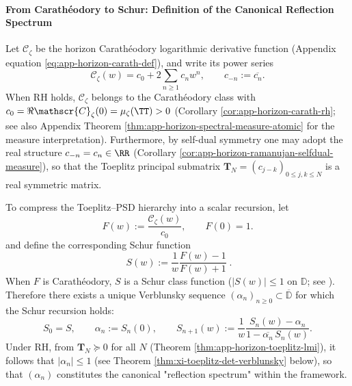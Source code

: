 \paragraph{From Carath\'eodory to Schur: Definition of the Canonical Reflection Spectrum}
Let \(\mathscr{C}_{\zeta}\) be the horizon Carath\'eodory logarithmic derivative function (Appendix equation \eqref{eq:app-horizon-carath-def}), and write its power series
\[
\mathscr{C}_{\zeta}(w)=c_0+2\sum_{n\ge 1}c_n w^n,
\qquad c_{-n}:=\overline{c_n}.
\]
When RH holds, \(\mathscr{C}_\zeta\) belongs to the Carath\'eodory class with \(c_0=\Re\mathscr{C}_\zeta(0)=\mu_\zeta(\TT)>0\) (Corollary \ref{cor:app-horizon-carath-rh}; see also Appendix Theorem \ref{thm:app-horizon-spectral-measure-atomic} for the measure interpretation).
Furthermore, by self-dual symmetry one may adopt the real structure \(c_{-n}=c_n\in\RR\) (Corollary \ref{cor:app-horizon-ramanujan-selfdual-measure}), so that the Toeplitz principal submatrix \(\mathbf{T}_N=(c_{j-k})_{0\le j,k\le N}\) is a real symmetric matrix.
\par
To compress the Toeplitz--PSD hierarchy into a scalar recursion, let
\[
F(w):=\frac{\mathscr{C}_{\zeta}(w)}{c_0},
\qquad F(0)=1.
\]
and define the corresponding Schur function
\begin{equation}\label{eq:xi-schur-from-carath}
\boxed{\;
S(w):=\frac{1}{w}\frac{F(w)-1}{F(w)+1}\; }.
\end{equation}
When \(F\) is Carath\'eodory, \(S\) is a Schur class function (\(|S(w)|\le 1\) on \(\mathbb{D}\); see \cite{Simon2005OPUC1}).
Therefore there exists a unique Verblunsky sequence \((\alpha_n)_{n\ge 0}\subset\overline{\mathbb{D}}\) for which the Schur recursion holds:
\[
S_0=S,\qquad \alpha_n:=S_n(0),\qquad
S_{n+1}(w):=\frac{1}{w}\frac{S_n(w)-\alpha_n}{1-\overline{\alpha_n}\,S_n(w)}.
\]
Under RH, from \(\mathbf{T}_N\succeq 0\) for all \(N\) (Theorem \ref{thm:app-horizon-toeplitz-lmi}), it follows that \(|\alpha_n|\le 1\) (see Theorem \ref{thm:xi-toeplitz-det-verblunsky} below), so that \((\alpha_n)\) constitutes the canonical "reflection spectrum" within the framework.

